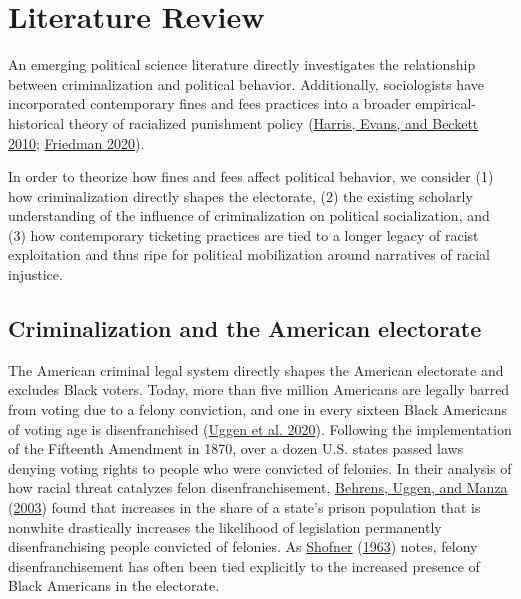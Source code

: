\documentclass[
  12pt,
]{article}
\begin{document}
\hypertarget{literature-review}{%
\section*{Literature Review}\label{literature-review}}

An emerging political science literature directly investigates the relationship between criminalization and political behavior. Additionally, sociologists have incorporated contemporary fines and fees practices into a broader empirical-historical theory of racialized punishment policy (\protect\hyperlink{ref-Harris2010}{Harris, Evans, and Beckett 2010}; \protect\hyperlink{ref-Friedman2020}{Friedman 2020}).

In order to theorize how fines and fees affect political behavior, we consider (1) how criminalization directly shapes the electorate, (2) the existing scholarly understanding of the influence of criminalization on political socialization, and (3) how contemporary ticketing practices are tied to a longer legacy of racist exploitation and thus ripe for political mobilization around narratives of racial injustice.

\hypertarget{criminalization-and-the-american-electorate}{%
\subsection*{Criminalization and the American electorate}\label{criminalization-and-the-american-electorate}}

The American criminal legal system directly shapes the American electorate and excludes Black voters. Today, more than five million Americans are legally barred from voting due to a felony conviction, and one in every sixteen Black Americans of voting age is disenfranchised (\protect\hyperlink{ref-Uggen2020}{Uggen et al. 2020}). Following the implementation of the Fifteenth Amendment in 1870, over a dozen U.S. states passed laws denying voting rights to people who were convicted of felonies. In their analysis of how racial threat catalyzes felon disenfranchisement, \protect\hyperlink{ref-Behrens2003}{Behrens, Uggen, and Manza} (\protect\hyperlink{ref-Behrens2003}{2003}) found that increases in the share of a state's prison population that is nonwhite drastically increases the likelihood of legislation permanently disenfranchising people convicted of felonies. As \protect\hyperlink{ref-Shofner1963}{Shofner} (\protect\hyperlink{ref-Shofner1963}{1963}) notes, felony disenfranchisement has often been tied explicitly to the increased presence of Black Americans in the electorate.
\end{document}
